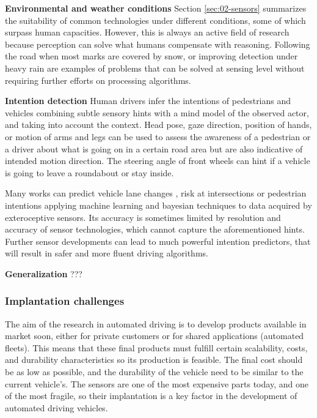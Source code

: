 \textbf{Environmental and weather conditions}    
    Section \ref{sec:02-sensors} summarizes the suitability of common 
    technologies under different conditions, some of which surpass human 
    capacities. 
    However, this is always an active field of research because perception 
    can solve what humans compensate with reasoning. Following the road 
    when most marks are covered by snow, or improving detection under heavy 
    rain are examples of problems that can be solved at sensing level
    without requiring further efforts on processing algorithms.
        
\textbf{Intention detection}        
    Human drivers infer the intentions of pedestrians and vehicles 
    combining subtle sensory hints with a mind model of the observed actor,
    and taking into account the context.
    Head pose, gaze direction, position of hands, or motion of arms and 
    legs can be used to assess the awareness of a pedestrian or a driver
    about what is going on in a certain road area but are also indicative 
    of intended motion direction. The steering angle of front wheels can
    hint if a vehicle is going to leave a roundabout or stay inside.
            
    Many works can predict vehicle lane changes \cite{Kim2017}, risk at
    intersections \cite{Lefevre2012} or pedestrian intentions
    \cite{Kohler2015,Fang2017} applying machine learning and bayesian
    techniques to data acquired by exteroceptive sensors. Its accuracy 
    is sometimes limited by resolution and accuracy of sensor technologies,
    which cannot capture the aforementioned hints.
    Further sensor developments can lead to much powerful intention 
    predictors, that will result in safer and more fluent driving 
    algorithms.
    
\textbf{Generalization} ???
    


\subsubsection{Implantation challenges}

The aim of the research in automated driving is to develop products available in market soon, either for private customers or for shared applications (automated fleets). This means that these final products must fulfill certain scalability, costs, and durability characteristics so its production is feasible. The final cost should be as low as possible, and the durability of the vehicle need to be similar to the current vehicle's. The sensors are one of the most expensive parts today, and one of the most fragile, so their implantation is a key factor in the development of automated driving vehicles.

